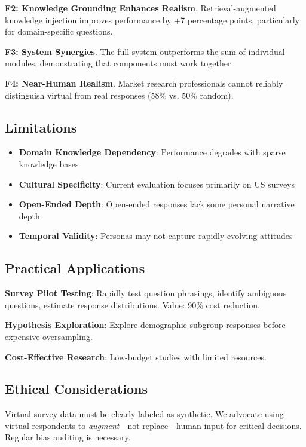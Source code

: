 \documentclass[sigconf,nonarchival]{acmart}
\begin{document}
\textbf{F2: Knowledge Grounding Enhances Realism}. Retrieval-augmented knowledge injection improves performance by +7 percentage points, particularly for domain-specific questions.

\textbf{F3: System Synergies}. The full system outperforms the sum of individual modules, demonstrating that components must work together.

\textbf{F4: Near-Human Realism}. Market research professionals cannot reliably distinguish virtual from real responses (58\% vs. 50\% random).

\subsection{Limitations}

\begin{itemize}
\item \textbf{Domain Knowledge Dependency}: Performance degrades with sparse knowledge bases
\item \textbf{Cultural Specificity}: Current evaluation focuses primarily on US surveys
\item \textbf{Open-Ended Depth}: Open-ended responses lack some personal narrative depth
\item \textbf{Temporal Validity}: Personas may not capture rapidly evolving attitudes
\end{itemize}

\subsection{Practical Applications}

\textbf{Survey Pilot Testing}: Rapidly test question phrasings, identify ambiguous questions, estimate response distributions. Value: 90\% cost reduction.

\textbf{Hypothesis Exploration}: Explore demographic subgroup responses before expensive oversampling.

\textbf{Cost-Effective Research}: Low-budget studies with limited resources.

\subsection{Ethical Considerations}

Virtual survey data must be clearly labeled as synthetic. We advocate using virtual respondents to \textit{augment}—not replace—human input for critical decisions. Regular bias auditing is necessary.
\end{document}

